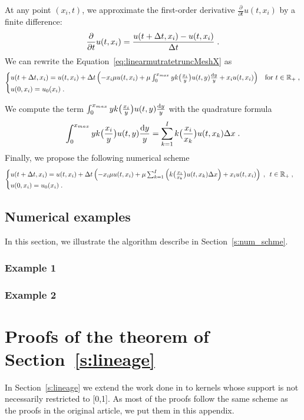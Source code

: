 \documentclass[11pt]{amsart}
\begin{document}
At any point $(x_i, t)$, we approximate the first-order derivative $\frac{\partial}{\partial t}u(t,x_i)$ by a finite difference:
$$\frac{\partial}{\partial t}u(t,x_i) = \frac{u(t+\Delta t,x_i) - u(t,x_i)}{\Delta t}
\; .$$
We can rewrite the Equation~\eqref{eq:linearmutratetruncMeshX} as
\begin{equation}
    \begin{cases}
    u(t+\Delta t,x_i) = u(t,x_i) + \Delta t \left(- x_i\mu u(t,x_i) + \mu \int_{0}^{x_{max}} y k\big( \frac{x_i}{y}\big) u(t,y) \frac{\mathrm dy}{y} + x_iu(t,x_i) \right)
	
	& \text{for }t \in \mathbb{R}_+ \; ,
	\\ 
	u(0, x_i) = u_0(x_i)
	\; .
    \end{cases}
    \label{eq:linearmutratetruncMeshXX}
\end{equation}

We compute the term $\int_{0}^{x_{max}} y k\big( \frac{x_i}{y}\big) u(t,y) \frac{\mathrm dy}{y}$ with the quadrature formula
$$ \int_{0}^{x_{max}} y k\big( \frac{x_i}{y}\big) u(t,y) \frac{\mathrm dy}{y}
= \sum_{k = 1}^I k \big( \frac{x_i}{x_k}\big) u(t,x_k) \Delta x \; .
$$ 
Finally, we propose the following numerical scheme
\begin{equation}
    \begin{cases}
    u(t+\Delta t,x_i) = u(t,x_i) + \Delta t \left(- x_i\mu u(t,x_i) + \mu \sum_{k = 1}^I \left(k \big( \frac{x_i}{x_k}\big) u(t,x_k) \Delta x \right) + x_iu(t,x_i) \right)
	\; , \enspace
	 t \in \mathbb{R}_+ \; ,
     \\
	u(0, x_i) = u_0(x_i)
    \; .
    \end{cases}
    \label{eq:numericalScheme}
\end{equation}

\subsection{Numerical examples} \mbox{}

In this section, we illustrate the algorithm describe in Section~\ref{s:num_schme}. 
\subsubsection{Example 1}
\subsubsection{Example 2}

\section{Proofs of the theorem of Section~\ref{s:lineage}}
In Section~\ref{s:lineage} we extend the work done in \cite{doumic2016time} to kernels whose support is not necessarily restricted to [0,1]. As most of the proofs follow the same scheme as the proofs in the original article, we put them in this appendix. 
\end{document}
